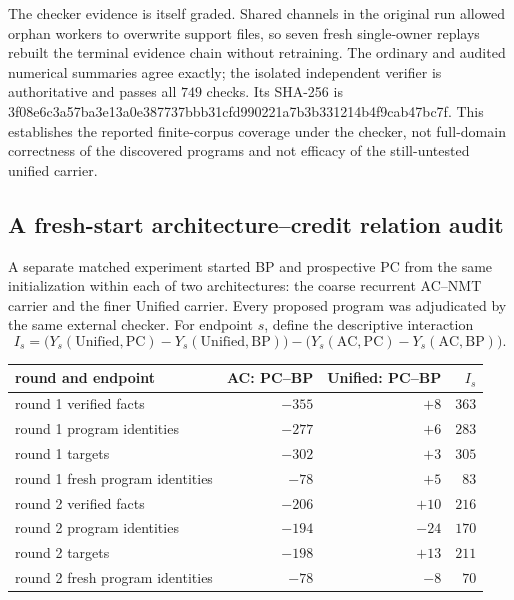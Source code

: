 \documentclass[11pt]{article}
\begin{document}
The checker evidence is itself graded. Shared channels in the original run allowed
orphan workers to overwrite support files, so seven fresh single-owner replays rebuilt
the terminal evidence chain without retraining. The ordinary and audited numerical
summaries agree exactly; the isolated independent verifier is authoritative and passes
all $749$ checks. Its SHA-256 is
{\scriptsize\ttfamily
3f08e6c3a57ba3e13a0e387737bbb31cfd990221a7b3b331214b4f9cab47bc7f}.
This establishes the reported finite-corpus coverage under the checker, not full-domain
correctness of the discovered programs and not efficacy of the still-untested unified
carrier.

\subsection{A fresh-start architecture--credit relation audit}
\label{sec:fresh-architecture-relation}

A separate matched experiment started BP and prospective PC from the same initialization
within each of two architectures: the coarse recurrent AC--NMT carrier and the finer
Unified carrier. Every proposed program was adjudicated by the same external checker.
For endpoint $s$, define the descriptive interaction
\[
 I_s =
 \bigl(Y_s(\mathrm{Unified},\mathrm{PC})
       -Y_s(\mathrm{Unified},\mathrm{BP})\bigr)
 -
 \bigl(Y_s(\mathrm{AC},\mathrm{PC})
       -Y_s(\mathrm{AC},\mathrm{BP})\bigr).
\]

\begin{center}\small
\begin{tabular}{@{}lrrr@{}}
\toprule
round and endpoint & AC: PC--BP & Unified: PC--BP & $I_s$ \\
\midrule
round 1 verified facts & $-355$ & $+8$ & $363$ \\
round 1 program identities & $-277$ & $+6$ & $283$ \\
round 1 targets & $-302$ & $+3$ & $305$ \\
round 1 fresh program identities & $-78$ & $+5$ & $83$ \\
\midrule
round 2 verified facts & $-206$ & $+10$ & $216$ \\
round 2 program identities & $-194$ & $-24$ & $170$ \\
round 2 targets & $-198$ & $+13$ & $211$ \\
round 2 fresh program identities & $-78$ & $-8$ & $70$ \\
\bottomrule
\end{tabular}
\end{center}
\end{document}
